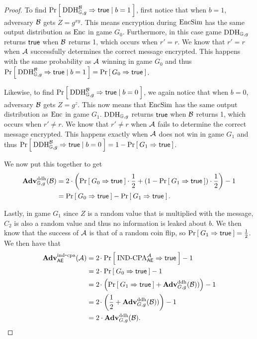 \begin{proof}
	To find $\Prob{\DDH_{\group, g}^\advB\Rightarrow\true \mid b=1}$, first notice that when $b=1$, adversary $\advB$ gets $Z = g^{xy}$. This means encryption during $\EncSim$ has the same output distribution as $\EncOracle$ in game $G_0$. Furthermore, in this case game $\DDH_{\group, g}$ returns $\true$ when $\advB$ returns 1, which occurs when $r'=r$. We know that $r'=r$ when $\advA$ successfully determines the correct message encrypted. This happens with the same probability as $\advA$ winning in game $G_0$ and thus $\Prob{\DDH_{\group, g}^\advB\Rightarrow\true \mid b=1} = \Prob{G_0 \Rightarrow\true}$. 
	
	Likewise, to find $\Prob{\DDH_{\group, g}^\advB\Rightarrow\true \mid b=0}$, we again notice that when $b=0$, adversary $\advB$ gets $Z = g^z$. This now means that $\EncSim$ has the same output distribution as $\EncOracle$ in game $G_1$. $\DDH_{\group, g}$ returns $\true$ when $\advB$ returns 1, which occurs when $r'\neq r$. We know that $r' \neq r$ when $\advA$ fails to determine the correct message encrypted. This happens exactly when $\advA$ does not win in game $G_1$ and thus $\Prob{\DDH_{\group, g}^\advB\Rightarrow\true \mid b=0} = 1 - \Prob{G_1 \Rightarrow\true}$. 
	
	We now put this together to get
	\begin{align*}
		\AdvDDH{\group,g}{\advB} &= 2 \cdot \left(\Prob{G_0 \Rightarrow\true} \cdot \frac{1}{2} + (1 - \Prob{G_1 \Rightarrow\true})\cdot\frac{1}{2}\right) - 1 \\
		&= \Prob{G_0 \Rightarrow\true} - \Prob{G_1 \Rightarrow\true}.
	\end{align*}
	
	Lastly, in game $G_1$ since $Z$ is a random value that is multiplied with the message, $C_2$ is also a random value and thus no information is leaked about $b$. We then know that the success of $\advA$ is that of a random coin flip, so $\Prob{G_1 \Rightarrow\true} = \frac{1}{2}$. We then have that
	\begin{align*}
		\AdvINDCPA{\AEnc}{\advA} 
		&= 2\cdotsm\Prob{\INDCPA_{\AEnc}^\advA\Rightarrow\true} - 1\\
		&= 2\cdotsm\Prob{G_0\Rightarrow\true} - 1\\
		&= 2\cdotsm\left(\Prob{G_1\Rightarrow\true} + \AdvDDH{G,g}{\advB})\right) - 1\\
		&= 2\cdotsm\left(\frac{1}{2}+ \AdvDDH{G,g}{\advB})\right) - 1 \\
		&= 2 \cdot \AdvDDH{G,g}{\advB}.
	\end{align*}
\end{proof}

